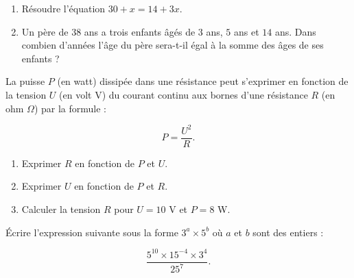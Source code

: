 \documentclass[a4paper,dvipsnames]{article}
\begin{document}
\bigskip

\exo[3 points] \vspace{-2mm}
\begin{enumerate}
  \item Résoudre l'équation $30+x=14+3x$.
  \item Un père de $38$ ans a trois enfants âgés de $3$ ans, $5$ ans et $14$ ans. Dans combien d'années l'âge du père sera-t-il égal à la somme des âges de ses enfants ?
\end{enumerate}

\bigskip

\exo[3 points] La puisse $P$ (en watt) dissipée dans une résistance peut s'exprimer en fonction de la tension $U$ (en volt V) du courant continu aux bornes d'une résistance $R$ (en ohm $\Omega$) par la formule :

\[P=\dfrac{U^2}{R}.\]

\begin{enumerate}
  \item Exprimer $R$ en fonction de $P$ et $U$.
  \item Exprimer $U$ en fonction de $P$ et $R$.
  \item Calculer la tension $R$ pour $U=10$ V et $P=8$ W.
\end{enumerate}

\bigskip
\exo[2 points] Écrire l'expression suivante sous la forme $3^a\times 5^b$ où $a$ et $b$ sont des entiers :

\[\dfrac{5^{10}\times 15^{-4}\times 3^4}{25^7}.\]

\dotfill{}

\bigskip
\end{document}
